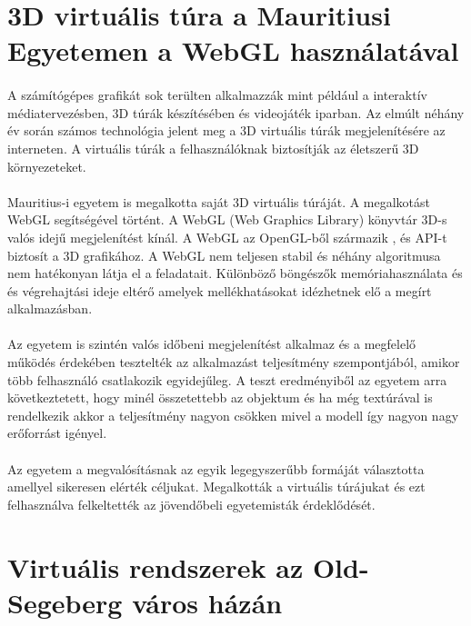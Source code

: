 \section{3D virtuális túra a Mauritiusi Egyetemen a WebGL használatával}
\paragraph{}
A számítógépes grafikát sok terülten alkalmazzák mint például a interaktív médiatervezésben, 3D túrák készítésében és videojáték iparban. Az elmúlt néhány év során számos technológia jelent meg a 3D virtuális túrák megjelenítésére az interneten. A virtuális túrák a felhasználóknak biztosítják az életszerű 3D környezeteket.
\paragraph{} 
Mauritius-i egyetem is megalkotta saját 3D virtuális túráját. A megalkotást WebGL segítségével történt. A WebGL (Web Graphics Library) könyvtár 3D-s valós idejű megjelenítést kínál. A WebGL az OpenGL-ből származik , és API-t biztosít a 3D grafikához.  A WebGL nem teljesen stabil  és néhány algoritmusa nem hatékonyan látja el a feladatait. Különböző böngészők memóriahasználata és és végrehajtási ideje eltérő amelyek mellékhatásokat idézhetnek elő a megírt alkalmazásban.
\paragraph{}
Az egyetem is szintén valós időbeni megjelenítést alkalmaz és a megfelelő működés érdekében tesztelték az alkalmazást teljesítmény szempontjából, amikor több felhasználó csatlakozik egyidejűleg.  A teszt eredményiből az egyetem arra következtetett, hogy minél összetettebb az objektum és ha még textúrával is rendelkezik akkor a teljesítmény nagyon csökken mivel a modell így nagyon nagy erőforrást igényel. 
\paragraph{}
Az egyetem a megvalósításnak az egyik legegyszerűbb formáját választotta amellyel sikeresen elérték céljukat. Megalkották a virtuális túrájukat és ezt felhasználva felkeltették az jövendőbeli egyetemisták érdeklődését.\cite{moloo20163d}

\section{Virtuális rendszerek az Old-Segeberg város házán}
